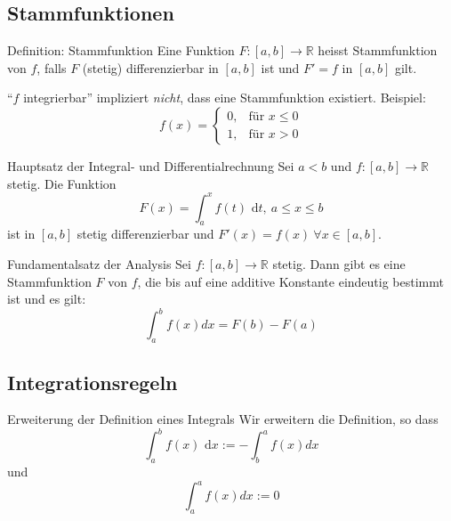\documentclass[a4paper,fontsize = 7pt]{scrartcl}
\def\R{\mathbb{R}}
\def\dx{\text{ d}x}
\begin{document}
\subsection{Stammfunktionen}
\begin{subbox}{Definition: Stammfunktion}
  \vspace{-4pt}
 Eine Funktion $F: [a,b] \to \R$ heisst Stammfunktion von $f$, falls $F$ (stetig) differenzierbar in $[a,b]$ ist und $F' = f$ in $[a,b]$ gilt.
 \vspace{-4pt}
\end{subbox}
``$f$ integrierbar'' impliziert \textit{nicht}, dass eine Stammfunktion existiert. Beispiel:
$$
 f(x) = \begin{cases}
        0, & \text{für } x \le 0 \\
        1, & \text{für } x > 0
        \end{cases}
$$

\begin{mainbox}{Hauptsatz der Integral- und Differentialrechnung}
  \vspace{-4pt}
  Sei $a<b$ und $f: [a,b] \to \R$ stetig. Die Funktion 
 $$F(x) = \int_a^x f(t) \text{ d}t, \ a \le x \le b$$
 ist in $[a,b]$ stetig differenzierbar und $F'(x) = f(x) \ \forall x \in [a,b]$.
 \vspace{-4pt}
\end{mainbox}

\begin{mainbox}{Fundamentalsatz der Analysis}
  \vspace{-4pt}
  Sei $f: [a,b] \to \R$ stetig. Dann gibt es eine Stammfunktion $F$ von $f$, die bis auf eine additive Konstante eindeutig bestimmt
  ist und es gilt: $$\int_a^b f(x)dx = F(b) - F(a)$$
  \vspace{-4pt}
\end{mainbox}

\subsection{Integrationsregeln}
\begin{subbox}{Erweiterung der Definition eines Integrals}
  \vspace{-4pt}
  Wir erweitern die Definition, so dass $$\int_a^b f(x)\dx := - \int_b^a f(x)dx$$ und $$\int_a^a f(x)dx := 0$$
  \vspace{-8pt}
\end{subbox}
\end{document}
